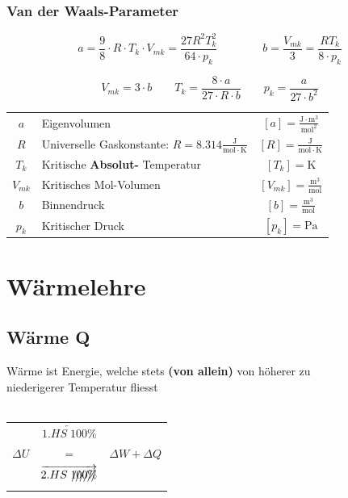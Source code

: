 \subsubsection{Van der Waals-Parameter}

$$ \boxed{ a = \frac{9}{8} \cdot R \cdot T_k \cdot V_{mk} = \frac{27 R^2 T_k^2}{64 \cdot p_k}}  \qquad \qquad  \boxed{ b = \frac{V_{mk}}{3} = \frac{R T_k}{8 \cdot p_k}}$$


$$ \boxed{ V_{mk} = 3 \cdot b } \quad \quad  \boxed{ T_k = \frac{8 \cdot a}{27 \cdot R \cdot b} } \quad \quad  \boxed{ p_k = \frac{a}{27 \cdot b^2} } $$



\begin{tabular}{c l c}
	\rule{0pt}{8pt}$a$ & Eigenvolumen & $[a] = \mathrm{\frac{J \cdot m^3}{mol^2}}$ \\
	\rule{0pt}{8pt}$R$ & Universelle Gaskonstante: $R = 8.314 \mathrm{\frac{J}{mol \cdot K}}$ & $[R] = \mathrm{\frac{J}{mol \cdot K}} $ \\
	$T_k$ & Kritische \textbf{Absolut-} Temperatur & $[T_k] = \mathrm{K}$ \\
	\rule{0pt}{8pt}$V_{mk}$ & Kritisches Mol-Volumen & $[V_{mk}] = \mathrm{\frac{m^3}{mol}}$ \\
	\rule{0pt}{8pt}$b$ & Binnendruck & $[b] = \mathrm{\frac{m^3}{mol}}$ \\
	$p_k$ & Kritischer Druck & $[p_k] = \mathrm{Pa}$ \\
\end{tabular}



\section{Wärmelehre}

\subsection{Wärme Q}
Wärme ist Energie, welche stets \textbf{(von allein)} von höherer zu \\
niederigerer Temperatur fliesst \\
\\

\begin{tabular}{l c l}
 & $\underleftarrow{1. HS \; 100\%}$ & \\
$\Delta U$ & $=$ & $\Delta W + \Delta Q$ \\
&  $\overrightarrow{2. HS  \; \xout{100\% }}$ & \\
\end{tabular}


